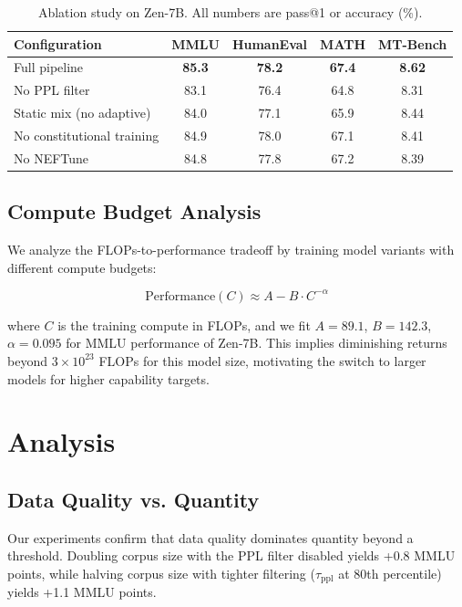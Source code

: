 \documentclass[11pt,a4paper]{article}
\begin{document}
\begin{table}[H]
\centering
\begin{tabular}{lcccc}
\toprule
\textbf{Configuration} & \textbf{MMLU} & \textbf{HumanEval} & \textbf{MATH} & \textbf{MT-Bench} \\
\midrule
Full pipeline & \textbf{85.3} & \textbf{78.2} & \textbf{67.4} & \textbf{8.62} \\
No PPL filter & 83.1 & 76.4 & 64.8 & 8.31 \\
Static mix (no adaptive) & 84.0 & 77.1 & 65.9 & 8.44 \\
No constitutional training & 84.9 & 78.0 & 67.1 & 8.41 \\
No NEFTune & 84.8 & 77.8 & 67.2 & 8.39 \\
\bottomrule
\end{tabular}
\caption{Ablation study on Zen-7B. All numbers are pass@1 or accuracy (\%).}
\end{table}

\subsection{Compute Budget Analysis}

We analyze the FLOPs-to-performance tradeoff by training model variants with
different compute budgets:

\begin{equation}
\text{Performance}(C) \approx A - B \cdot C^{-\alpha}
\end{equation}

where $C$ is the training compute in FLOPs, and we fit $A=89.1$, $B=142.3$,
$\alpha=0.095$ for MMLU performance of Zen-7B. This implies diminishing returns
beyond $3\times10^{23}$ FLOPs for this model size, motivating the switch to larger
models for higher capability targets.

\section{Analysis}

\subsection{Data Quality vs. Quantity}

Our experiments confirm that data quality dominates quantity beyond a threshold.
Doubling corpus size with the PPL filter disabled yields +0.8 MMLU points, while
halving corpus size with tighter filtering ($\tau_\text{ppl}$ at 80th percentile)
yields +1.1 MMLU points.
\end{document}

